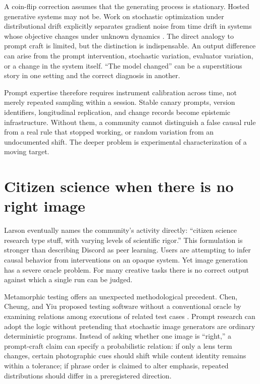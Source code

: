 \documentclass[11pt]{article}
\begin{document}
A coin-flip correction assumes that the generating process is stationary. Hosted generative systems may not be. Work on stochastic optimization under distributional drift explicitly separates gradient noise from time drift in systems whose objective changes under unknown dynamics \cite{CutlerDrusvyatskiyHarchaoui2023}. The direct analogy to prompt craft is limited, but the distinction is indispensable. An output difference can arise from the prompt intervention, stochastic variation, evaluator variation, or a change in the system itself. ``The model changed'' can be a superstitious story in one setting and the correct diagnosis in another.

Prompt expertise therefore requires instrument calibration across time, not merely repeated sampling within a session. Stable canary prompts, version identifiers, longitudinal replication, and change records become epistemic infrastructure. Without them, a community cannot distinguish a false causal rule from a real rule that stopped working, or random variation from an undocumented shift. The deeper problem is experimental characterization of a moving target.

\section{Citizen science when there is no right image}
Larson eventually names the community’s activity directly: ``citizen science research type stuff, with varying levels of scientific rigor.'' This formulation is stronger than describing Discord as peer learning. Users are attempting to infer causal behavior from interventions on an opaque system. Yet image generation has a severe oracle problem. For many creative tasks there is no correct output against which a single run can be judged.

Metamorphic testing offers an unexpected methodological precedent. Chen, Cheung, and Yiu proposed testing software without a conventional oracle by examining relations among executions of related test cases \cite{ChenCheungYiu1998}. Prompt research can adopt the logic without pretending that stochastic image generators are ordinary deterministic programs. Instead of asking whether one image is ``right,'' a prompt-craft claim can specify a probabilistic relation: if only a lens term changes, certain photographic cues should shift while content identity remains within a tolerance; if phrase order is claimed to alter emphasis, repeated distributions should differ in a preregistered direction.
\end{document}
